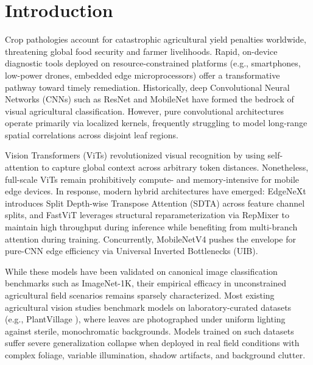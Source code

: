 \documentclass[conference]{IEEEtran}
\begin{document}
\section{Introduction}
Crop pathologies account for catastrophic agricultural yield penalties worldwide, threatening global food security and farmer livelihoods. Rapid, on-device diagnostic tools deployed on resource-constrained platforms (e.g., smartphones, low-power drones, embedded edge microprocessors) offer a transformative pathway toward timely remediation. Historically, deep Convolutional Neural Networks (CNNs) such as ResNet \cite{resnet} and MobileNet \cite{mobilenetv1} have formed the bedrock of visual agricultural classification. However, pure convolutional architectures operate primarily via localized kernels, frequently struggling to model long-range spatial correlations across disjoint leaf regions.

Vision Transformers (ViTs) \cite{vit} revolutionized visual recognition by using self-attention to capture global context across arbitrary token distances. Nonetheless, full-scale ViTs remain prohibitively compute- and memory-intensive for mobile edge devices. In response, modern hybrid architectures have emerged: EdgeNeXt \cite{edgenext} introduces Split Depth-wise Transpose Attention (SDTA) across feature channel splits, and FastViT \cite{fastvit} leverages structural reparameterization via RepMixer to maintain high throughput during inference while benefiting from multi-branch attention during training. Concurrently, MobileNetV4 \cite{mobilenetv4} pushes the envelope for pure-CNN edge efficiency via Universal Inverted Bottlenecks (UIB).

While these models have been validated on canonical image classification benchmarks such as ImageNet-1K, their empirical efficacy in unconstrained agricultural field scenarios remains sparsely characterized. Most existing agricultural vision studies benchmark models on laboratory-curated datasets (e.g., PlantVillage \cite{plantvillage}), where leaves are photographed under uniform lighting against sterile, monochromatic backgrounds. Models trained on such datasets suffer severe generalization collapse when deployed in real field conditions with complex foliage, variable illumination, shadow artifacts, and background clutter.
\end{document}
